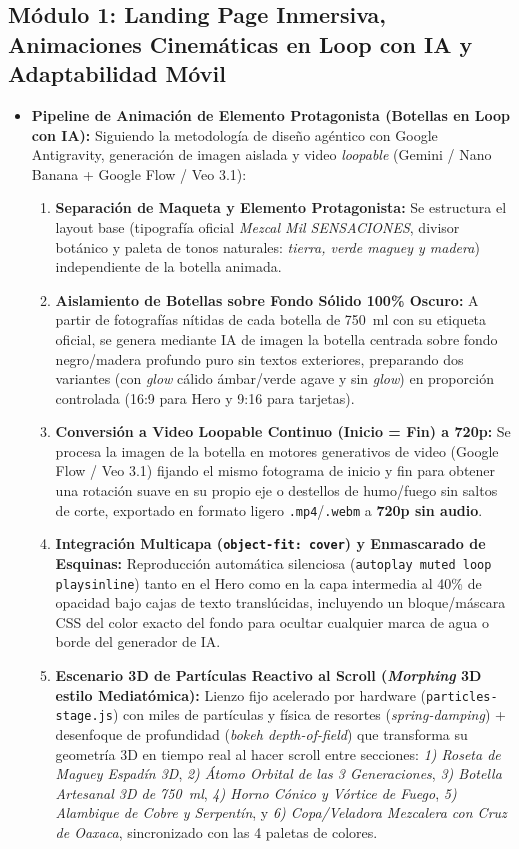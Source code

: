 \documentclass[11pt,letterpaper]{article}
\begin{document}
\subsection{Módulo 1: Landing Page Inmersiva, Animaciones Cinemáticas en Loop con IA y Adaptabilidad Móvil}
\begin{itemize}[leftmargin=1.5cm]
    \item \textbf{Pipeline de Animación de Elemento Protagonista (Botellas en Loop con IA):} Siguiendo la metodología de diseño agéntico con Google Antigravity, generación de imagen aislada y video \textit{loopable} (Gemini / Nano Banana + Google Flow / Veo 3.1):
    \begin{enumerate}[label=\textbf{\alph*)}]
        \item \textbf{Separación de Maqueta y Elemento Protagonista:} Se estructura el layout base (tipografía oficial \textit{Mezcal Mil SENSACIONES}, divisor botánico y paleta de tonos naturales: \textit{tierra, verde maguey y madera}) independiente de la botella animada.
        \item \textbf{Aislamiento de Botellas sobre Fondo Sólido 100\% Oscuro:} A partir de fotografías nítidas de cada botella de 750~ml con su etiqueta oficial, se genera mediante IA de imagen la botella centrada sobre fondo negro/madera profundo puro sin textos exteriores, preparando dos variantes (con \textit{glow} cálido ámbar/verde agave y sin \textit{glow}) en proporción controlada (16:9 para Hero y 9:16 para tarjetas).
        \item \textbf{Conversión a Video Loopable Continuo (Inicio = Fin) a 720p:} Se procesa la imagen de la botella en motores generativos de video (Google Flow / Veo 3.1) fijando el mismo fotograma de inicio y fin para obtener una rotación suave en su propio eje o destellos de humo/fuego sin saltos de corte, exportado en formato ligero \texttt{.mp4}/\texttt{.webm} a \textbf{720p sin audio}.
        \item \textbf{Integración Multicapa (\texttt{object-fit: cover}) y Enmascarado de Esquinas:} Reproducción automática silenciosa (\texttt{autoplay muted loop playsinline}) tanto en el Hero como en la capa intermedia al 40\% de opacidad bajo cajas de texto translúcidas, incluyendo un bloque/máscara CSS del color exacto del fondo para ocultar cualquier marca de agua o borde del generador de IA.
        \item \textbf{Escenario 3D de Partículas Reactivo al Scroll (\textit{Morphing} 3D estilo Mediatómica):} Lienzo fijo acelerado por hardware (\texttt{particles-stage.js}) con miles de partículas y física de resortes (\textit{spring-damping}) + desenfoque de profundidad (\textit{bokeh depth-of-field}) que transforma su geometría 3D en tiempo real al hacer scroll entre secciones: \textit{1) Roseta de Maguey Espadín 3D}, \textit{2) Átomo Orbital de las 3 Generaciones}, \textit{3) Botella Artesanal 3D de 750~ml}, \textit{4) Horno Cónico y Vórtice de Fuego}, \textit{5) Alambique de Cobre y Serpentín}, y \textit{6) Copa/Veladora Mezcalera con Cruz de Oaxaca}, sincronizado con las 4 paletas de colores.

\end{enumerate}
\end{itemize}
\end{document}
